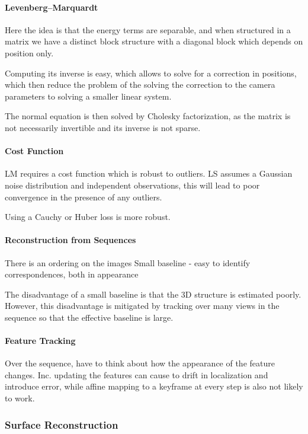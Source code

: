 \begin{enumerate}
\paragraph{Levenberg–Marquardt}

Here the idea is that the energy terms are separable, and when structured in a matrix we have a distinct block structure with a diagonal block which depends on position only. 

Computing its inverse is easy, which allows to solve for a correction in positions, which then reduce the problem of the solving the correction to the camera parameters to solving a smaller linear system.

The normal equation is then solved by Cholesky factorization, as the matrix is not necessarily invertible and its inverse is not sparse.

\paragraph{Cost Function}
LM requires a cost function which is robust to outliers. 
LS assumes a Gaussian noise distribution and independent observations, this will lead to poor convergence in the presence of any outliers. 

Using a Cauchy or Huber loss is more robust.

\paragraph{Reconstruction from Sequences}

There is an ordering on the images
Small baseline - easy to identify correspondences, both in appearance 

The disadvantage of a small baseline is that the 3D structure is estimated poorly. However, this disadvantage is mitigated by tracking over many views in the sequence so that the effective baseline is large.


\paragraph{Feature Tracking}

Over the sequence, have to think about how the appearance of the feature changes.
Inc. updating the features can cause to drift in localization and introduce error, while affine mapping to a keyframe at every step is also not likely to work.


\subsubsection{Surface Reconstruction}


\end{enumerate}
